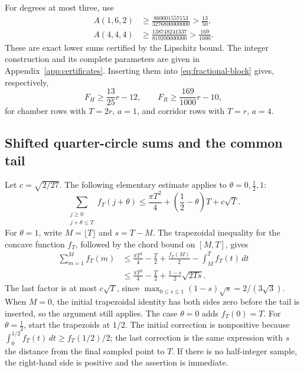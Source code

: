 \documentclass[11pt,reqno]{amsart}
\numberwithin{equation}{section}
\begin{document}
For degrees at most three, use
\begin{align}
 A(1,6,2)&\ge\frac{860001557153}{3276800000000}>
                 \frac{13}{50},\\
 A(4,4,4)&\ge\frac{138748241337}{819200000000}>
                 \frac{169}{1000}.
 \label{eq:block-integrals}
\end{align}
These are exact lower sums certified by the Lipschitz bound. The integer
construction and its complete parameters are given in
Appendix~\ref{app:certificates}. Inserting them into
\eqref{eq:fractional-block} gives, respectively,
\begin{equation}
 F_H\ge\frac{13}{25}r-12,
 \qquad F_R\ge\frac{169}{1000}r-10,
 \label{eq:fractional-losses}
\end{equation}
for chamber rows with $T=2r$, $a=1$, and corridor rows with $T=r$, $a=4$.

\subsection{Shifted quarter-circle sums and the common tail}

Let $c=\sqrt{2/27}$. The following elementary estimate applies to
$\theta=0,\tfrac12,1$:
\begin{equation}
 \sum_{\substack{j\ge0\\j+\theta\le T}} f_T(j+\theta)
 \le\frac{\pi T^2}{4}+\left(\frac12-\theta\right)T
          +c\sqrt T.
 \label{eq:shifted-circle}
\end{equation}
For $\theta=1$, write $M=\lfloor T\rfloor$ and $s=T-M$. The
trapezoidal inequality for the concave function $f_T$, followed by the
chord bound on $[M,T]$, gives
\[
 \begin{split}
 \sum_{m=1}^{M}f_T(m)
 &\le\frac{\pi T^2}{4}-\frac T2+
            \frac{f_T(M)}2-\int_M^T f_T(t)\,dt\\
 &\le\frac{\pi T^2}{4}-\frac T2+
            \frac{1-s}{2}\sqrt{2Ts}.
 \end{split}
\]
The last factor is at most $c\sqrt T$, since
$\max_{0\le s\le1}(1-s)\sqrt{s}=2/(3\sqrt3)$.
When $M=0$, the initial trapezoidal identity has both sides zero before
the tail is inserted, so the argument still applies. The case $\theta=0$
adds $f_T(0)=T$. For $\theta=\tfrac12$, start the trapezoids at
$1/2$. The initial correction is nonpositive because
$\int_0^{1/2}f_T(t)\,dt\ge f_T(1/2)/2$; the last correction is the
same expression with $s$ the distance from the final sampled point to
$T$. If there is no half-integer sample, the right-hand side is positive
and the assertion is immediate.
\end{document}
